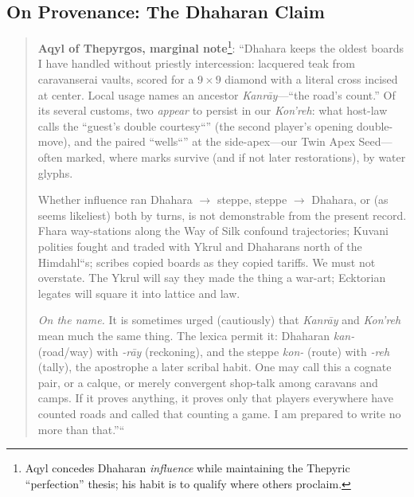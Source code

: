 \documentclass[11pt]{article}
\begin{document}
\subsection*{On Provenance: The Dhaharan Claim}
\begin{quote}\small
\textbf{Aqyl of Thepyrgos, marginal note}\footnote{Aqyl concedes Dhaharan \emph{influence} while maintaining the Thepyric ``perfection'' thesis; his habit is to qualify where others proclaim.}:
``Dhahara keeps the oldest boards I have handled without priestly intercession: lacquered teak from caravanserai vaults, scored for a $9\times9$ diamond with a literal cross incised at center. Local usage names an ancestor \emph{Kanrāy}---``the road's count.'' Of its several customs, two \emph{appear} to persist in our \emph{Kon'reh}: what host-law calls the ``guest's double courtesy``'' (the second player's opening double-move), and the paired ``wells``'' at the side-apex---our Twin Apex Seed---often marked, where marks survive (and if not later restorations), by water glyphs.

Whether influence ran Dhahara $\rightarrow$ steppe, steppe $\rightarrow$ Dhahara, or (as seems likeliest) both by turns, is not demonstrable from the present record. Fhara way-stations along the Way of Silk confound trajectories; Kuvani polities fought and traded with Ykrul and Dhaharans north of the Himdahl``s; scribes copied boards as they copied tariffs. We must not overstate. The Ykrul will say they made the thing a war-art; Ecktorian legates will square it into lattice and law.

\emph{On the name.} It is sometimes urged (cautiously) that \emph{Kanrāy} and \emph{Kon'reh} mean much the same thing. The lexica permit it: Dhaharan \emph{kan-} (road/way) with \emph{-rāy} (reckoning), and the steppe \emph{kon-} (route) with \emph{-reh} (tally), the apostrophe a later scribal habit. One may call this a cognate pair, or a calque, or merely convergent shop-talk among caravans and camps. If it proves anything, it proves only that players everywhere have counted roads and called that counting a game. I am prepared to write no more than that.''``
\end{quote}
\end{document}
